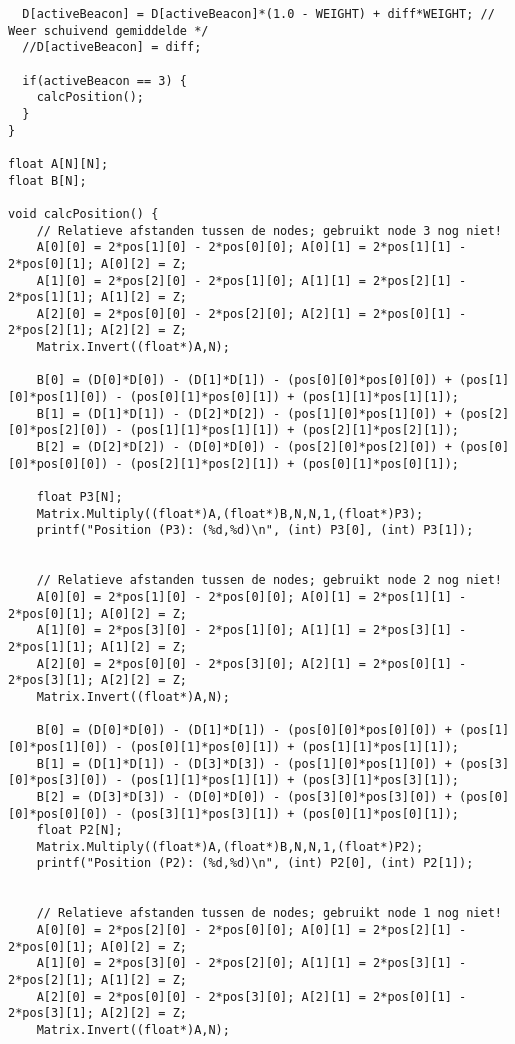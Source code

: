\begin{lstlisting}
  D[activeBeacon] = D[activeBeacon]*(1.0 - WEIGHT) + diff*WEIGHT; // Weer schuivend gemiddelde */
  //D[activeBeacon] = diff;

  if(activeBeacon == 3) {
    calcPosition();
  }
}

float A[N][N];
float B[N];

void calcPosition() {
    // Relatieve afstanden tussen de nodes; gebruikt node 3 nog niet!
    A[0][0] = 2*pos[1][0] - 2*pos[0][0]; A[0][1] = 2*pos[1][1] - 2*pos[0][1]; A[0][2] = Z;
    A[1][0] = 2*pos[2][0] - 2*pos[1][0]; A[1][1] = 2*pos[2][1] - 2*pos[1][1]; A[1][2] = Z;
    A[2][0] = 2*pos[0][0] - 2*pos[2][0]; A[2][1] = 2*pos[0][1] - 2*pos[2][1]; A[2][2] = Z;
    Matrix.Invert((float*)A,N);

    B[0] = (D[0]*D[0]) - (D[1]*D[1]) - (pos[0][0]*pos[0][0]) + (pos[1][0]*pos[1][0]) - (pos[0][1]*pos[0][1]) + (pos[1][1]*pos[1][1]);
    B[1] = (D[1]*D[1]) - (D[2]*D[2]) - (pos[1][0]*pos[1][0]) + (pos[2][0]*pos[2][0]) - (pos[1][1]*pos[1][1]) + (pos[2][1]*pos[2][1]);
    B[2] = (D[2]*D[2]) - (D[0]*D[0]) - (pos[2][0]*pos[2][0]) + (pos[0][0]*pos[0][0]) - (pos[2][1]*pos[2][1]) + (pos[0][1]*pos[0][1]);
    
    float P3[N];
    Matrix.Multiply((float*)A,(float*)B,N,N,1,(float*)P3);
    printf("Position (P3): (%d,%d)\n", (int) P3[0], (int) P3[1]);
    

    // Relatieve afstanden tussen de nodes; gebruikt node 2 nog niet!
    A[0][0] = 2*pos[1][0] - 2*pos[0][0]; A[0][1] = 2*pos[1][1] - 2*pos[0][1]; A[0][2] = Z;
    A[1][0] = 2*pos[3][0] - 2*pos[1][0]; A[1][1] = 2*pos[3][1] - 2*pos[1][1]; A[1][2] = Z;
    A[2][0] = 2*pos[0][0] - 2*pos[3][0]; A[2][1] = 2*pos[0][1] - 2*pos[3][1]; A[2][2] = Z;
    Matrix.Invert((float*)A,N);

    B[0] = (D[0]*D[0]) - (D[1]*D[1]) - (pos[0][0]*pos[0][0]) + (pos[1][0]*pos[1][0]) - (pos[0][1]*pos[0][1]) + (pos[1][1]*pos[1][1]);
    B[1] = (D[1]*D[1]) - (D[3]*D[3]) - (pos[1][0]*pos[1][0]) + (pos[3][0]*pos[3][0]) - (pos[1][1]*pos[1][1]) + (pos[3][1]*pos[3][1]);
    B[2] = (D[3]*D[3]) - (D[0]*D[0]) - (pos[3][0]*pos[3][0]) + (pos[0][0]*pos[0][0]) - (pos[3][1]*pos[3][1]) + (pos[0][1]*pos[0][1]);
    float P2[N];
    Matrix.Multiply((float*)A,(float*)B,N,N,1,(float*)P2);
    printf("Position (P2): (%d,%d)\n", (int) P2[0], (int) P2[1]);
    
    
    // Relatieve afstanden tussen de nodes; gebruikt node 1 nog niet!
    A[0][0] = 2*pos[2][0] - 2*pos[0][0]; A[0][1] = 2*pos[2][1] - 2*pos[0][1]; A[0][2] = Z;
    A[1][0] = 2*pos[3][0] - 2*pos[2][0]; A[1][1] = 2*pos[3][1] - 2*pos[2][1]; A[1][2] = Z;
    A[2][0] = 2*pos[0][0] - 2*pos[3][0]; A[2][1] = 2*pos[0][1] - 2*pos[3][1]; A[2][2] = Z;
    Matrix.Invert((float*)A,N);
   

\end{lstlisting}
